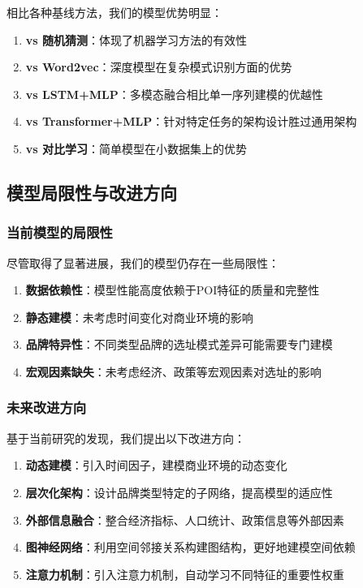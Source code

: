 \documentclass{article}
\begin{document}
相比各种基线方法，我们的模型优势明显：

\begin{enumerate}
\item \textbf{vs 随机猜测}：体现了机器学习方法的有效性
\item \textbf{vs Word2vec}：深度模型在复杂模式识别方面的优势
\item \textbf{vs LSTM+MLP}：多模态融合相比单一序列建模的优越性
\item \textbf{vs Transformer+MLP}：针对特定任务的架构设计胜过通用架构
\item \textbf{vs 对比学习}：简单模型在小数据集上的优势
\end{enumerate}

\subsection{模型局限性与改进方向}

\subsubsection{当前模型的局限性}

尽管取得了显著进展，我们的模型仍存在一些局限性：

\begin{enumerate}
\item \textbf{数据依赖性}：模型性能高度依赖于POI特征的质量和完整性
\item \textbf{静态建模}：未考虑时间变化对商业环境的影响
\item \textbf{品牌特异性}：不同类型品牌的选址模式差异可能需要专门建模
\item \textbf{宏观因素缺失}：未考虑经济、政策等宏观因素对选址的影响
\end{enumerate}

\subsubsection{未来改进方向}

基于当前研究的发现，我们提出以下改进方向：

\begin{enumerate}
\item \textbf{动态建模}：引入时间因子，建模商业环境的动态变化
\item \textbf{层次化架构}：设计品牌类型特定的子网络，提高模型的适应性
\item \textbf{外部信息融合}：整合经济指标、人口统计、政策信息等外部因素
\item \textbf{图神经网络}：利用空间邻接关系构建图结构，更好地建模空间依赖
\item \textbf{注意力机制}：引入注意力机制，自动学习不同特征的重要性权重
\end{enumerate}
\end{document}
